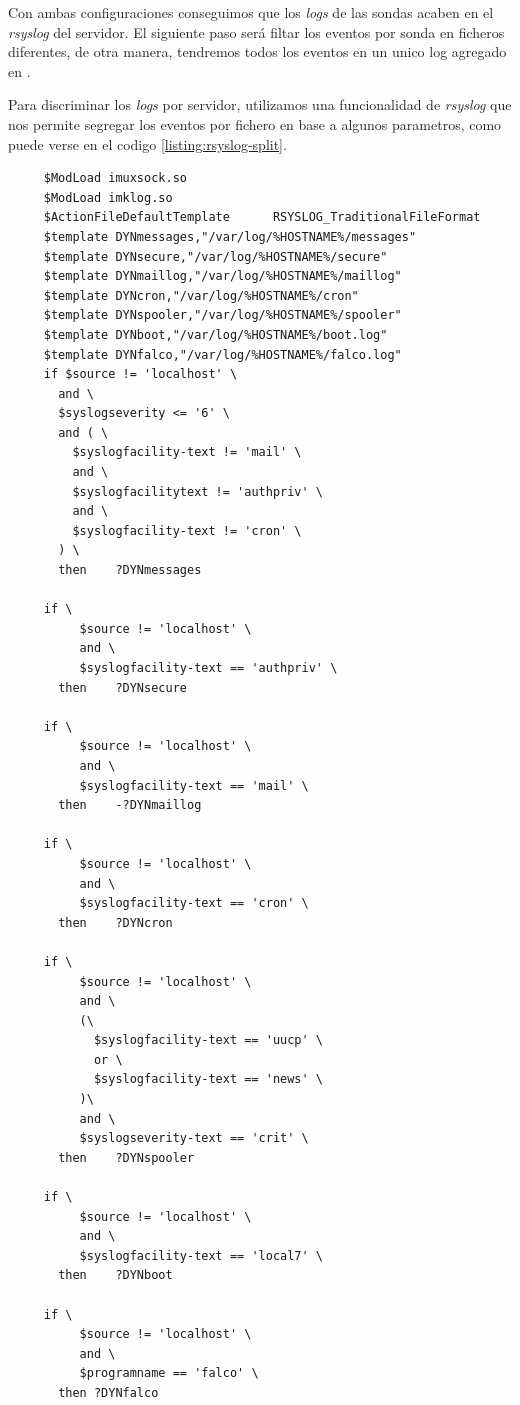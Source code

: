 Con ambas configuraciones conseguimos que los \emph{logs} de las sondas acaben en el \emph{rsyslog} del servidor.
El siguiente paso será filtar los eventos por sonda en ficheros diferentes, de otra manera, tendremos todos los eventos
en un unico log agregado en .

Para discriminar los \emph{logs} por servidor, utilizamos una funcionalidad de \emph{rsyslog} que nos permite
segregar los eventos por fichero en base a algunos parametros, como puede verse en el codigo \ref{listing:rsyslog-split}.

\begin{verbatim}
     $ModLoad imuxsock.so
     $ModLoad imklog.so
     $ActionFileDefaultTemplate      RSYSLOG_TraditionalFileFormat
     $template DYNmessages,"/var/log/%HOSTNAME%/messages"
     $template DYNsecure,"/var/log/%HOSTNAME%/secure"
     $template DYNmaillog,"/var/log/%HOSTNAME%/maillog"
     $template DYNcron,"/var/log/%HOSTNAME%/cron"
     $template DYNspooler,"/var/log/%HOSTNAME%/spooler"
     $template DYNboot,"/var/log/%HOSTNAME%/boot.log"
     $template DYNfalco,"/var/log/%HOSTNAME%/falco.log"
     if $source != 'localhost' \
       and \
       $syslogseverity <= '6' \
       and ( \
         $syslogfacility-text != 'mail' \
         and \
         $syslogfacilitytext != 'authpriv' \
         and \
         $syslogfacility-text != 'cron' \
       ) \
       then    ?DYNmessages

     if \
          $source != 'localhost' \
          and \
          $syslogfacility-text == 'authpriv' \
       then    ?DYNsecure

     if \
          $source != 'localhost' \
          and \
          $syslogfacility-text == 'mail' \
       then    -?DYNmaillog

     if \
          $source != 'localhost' \
          and \
          $syslogfacility-text == 'cron' \
       then    ?DYNcron

     if \
          $source != 'localhost' \
          and \
          (\
            $syslogfacility-text == 'uucp' \
            or \
            $syslogfacility-text == 'news' \
          )\
          and \
          $syslogseverity-text == 'crit' \
       then    ?DYNspooler

     if \
          $source != 'localhost' \
          and \
          $syslogfacility-text == 'local7' \
       then    ?DYNboot

     if \
          $source != 'localhost' \
          and \
          $programname == 'falco' \
       then ?DYNfalco
\end{verbatim}
\bigskip

